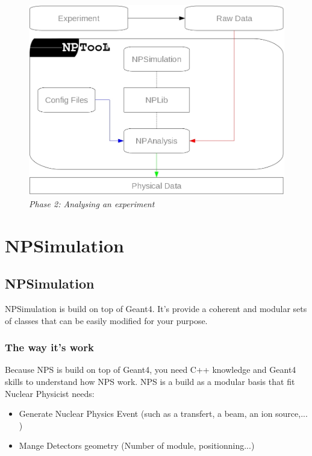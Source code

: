 \documentclass{book}
\begin{document}
				\begin{figure}[!htbp]
					\centering
					\includegraphics[width=1\textwidth]{./pictures/nptool_scheme_Ana.png}
					\caption{ \emph{Phase 2: Analysing an experiment} }
				\end{figure}
				
\chapter[NPSimulation]{NPSimulation}

\section{NPSimulation}

NPSimulation is build on top of Geant4. It's provide a coherent and modular sets of classes that can be easily modified for your purpose.

\subsection{ The way it's work }

Because NPS is build on top of Geant4, you need C++ knowledge and Geant4 skills to understand how NPS work. NPS is a build as a modular basis that fit Nuclear Physicist needs: 
	\begin{itemize}
		\item Generate Nuclear Physics Event (such as a transfert, a beam, an ion source,... ) 
		\item Mange Detectors geometry (Number of module, positionning...)
	\end{itemize}
\end{document}
